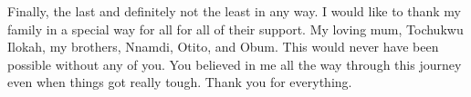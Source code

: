 \begin{acknowledgements}
Finally, the last and definitely not the least in any way. I would like to thank my family in a special way for all for all of their support. My loving mum, Tochukwu Ilokah, my brothers, Nnamdi, Otito, and Obum. This would never have been possible without any of you. You believed in me all the way through this journey even when things got really tough. Thank you for everything.

\end{acknowledgements}
